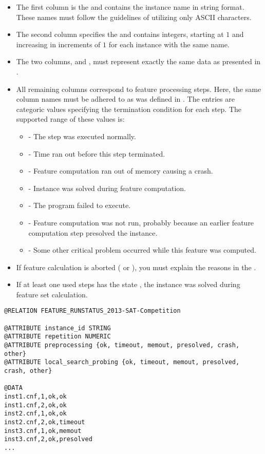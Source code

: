\documentclass[]{elsarticle}
\begin{document}
\begin{itemize}
	\item The first column is the  and contains the instance name in string format. These names 
  		must follow the guidelines of utilizing only ASCII characters.
  	\item The second column specifies the  and contains integers, starting at $1$ and increasing in 
  		increments of $1$ for each instance with the same name.  
  	\item The two columns,  and , must represent exactly the same data as
  		presented in .
  	\item All remaining columns correspond to feature processing steps. Here, the same column names  
  		must be adhered to as was defined in . The entries are categoric values
		specifying the termination condition for each step. The supported range of these values is: 
        		\begin{itemize}
        			\item {} - The step was executed normally.
        			\item {} - Time ran out before this step terminated.
       		 		\item {} - Feature computation ran out of memory causing a crash.
					\item {} - Instance was solved during feature computation.
        			\item {} - The program failed to execute.
        			\item {} - Feature computation was not run,
                    probably because an earlier feature computation step
                    presolved the instance.
        			\item {} - Some other critical problem occurred while this feature was computed.
        		\end{itemize}
  	\item If feature calculation is aborted ( or ), you must explain the reasons in 
		the .
  	\item If at least one used steps has the state , the instance was solved during feature set calculation.
\end{itemize} 


\begin{lstlisting}[caption=Example feature\_runstatus.arff with two feature processing steps]
@RELATION FEATURE_RUNSTATUS_2013-SAT-Competition

@ATTRIBUTE instance_id STRING
@ATTRIBUTE repetition NUMERIC
@ATTRIBUTE preprocessing {ok, timeout, memout, presolved, crash, other}
@ATTRIBUTE local_search_probing {ok, timeout, memout, presolved, crash, other}

@DATA
inst1.cnf,1,ok,ok
inst1.cnf,2,ok,ok
inst2.cnf,1,ok,ok
inst2.cnf,2,ok,timeout
inst3.cnf,1,ok,memout
inst3.cnf,2,ok,presolved
...
\end{lstlisting}
\end{document}
